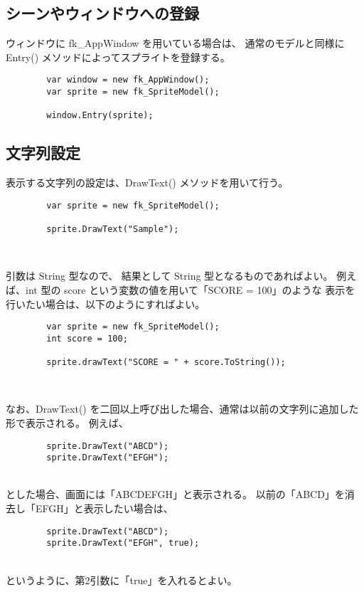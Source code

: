 \subsection{シーンやウィンドウへの登録}

ウィンドウに fk\_AppWindow を用いている場合は、
通常のモデルと同様に Entry() メソッドによってスプライトを登録する。
\\
\begin{screen}
\begin{verbatim}
        var window = new fk_AppWindow();
        var sprite = new fk_SpriteModel();
    
        window.Entry(sprite);
\end{verbatim}
\end{screen}

\subsection{文字列設定}
表示する文字列の設定は、DrawText() メソッドを用いて行う。
\\
\begin{screen}
\begin{verbatim}
        var sprite = new fk_SpriteModel();
    
        sprite.DrawText("Sample");
\end{verbatim}
\end{screen}
~

引数は String 型なので、
結果として String 型となるものであればよい。
例えば、int 型の score という変数の値を用いて「SCORE = 100」のような
表示を行いたい場合は、以下のようにすればよい。
\\
\begin{screen}
\begin{verbatim}
        var sprite = new fk_SpriteModel();
        int score = 100;
    
        sprite.drawText("SCORE = " + score.ToString());
\end{verbatim}
\end{screen}
~

なお、DrawText() を二回以上呼び出した場合、通常は以前の文字列に追加した形で表示される。
例えば、
\\
\begin{screen}
\begin{verbatim}
        sprite.DrawText("ABCD");
        sprite.DrawText("EFGH");
\end{verbatim}
\end{screen}
~ \\
とした場合、画面には「ABCDEFGH」と表示される。
以前の「ABCD」を消去し「EFGH」と表示したい場合は、
\\
\begin{screen}
\begin{verbatim}
        sprite.DrawText("ABCD");
        sprite.DrawText("EFGH", true);
\end{verbatim}
\end{screen}
~ \\
というように、第2引数に「true」を入れるとよい。

